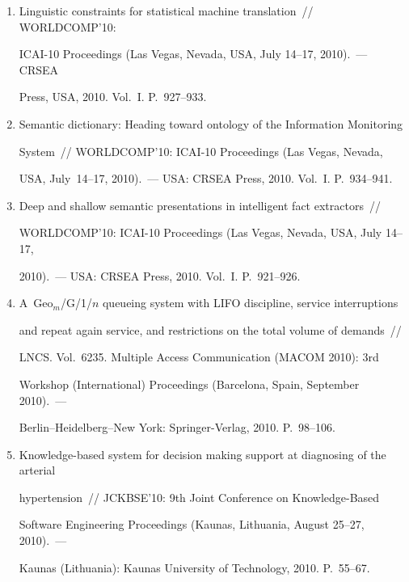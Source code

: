\begin{enumerate}[1.]
\item {}


Linguistic constraints for statistical machine translation~/\!\!/  WORLDCOMP'10: 


ICAI-10 Proceedings (Las Vegas, Nevada, USA, July 14--17, 2010).~--- CRSEA 


Press, USA, 2010. Vol.~I. P.~927--933.


\item {}


Semantic dictionary: Heading toward ontology of the Information Monitoring 


System~/\!\!/  WORLDCOMP'10: ICAI-10 Proceedings (Las Vegas, Nevada, 


USA, July~14--17, 2010).~--- USA: CRSEA Press, 2010. Vol.~I. P.~934--941.


\item{}


Deep and shallow semantic presentations in intelligent fact extractors~/\!\!/  


WORLDCOMP'10: ICAI-10 Proceedings (Las Vegas, Nevada, USA, July 14--17, 


2010).~--- USA: CRSEA Press, 2010. Vol.~I. P.~921--926.


\item{}


A~Geo$_m$/G/1/$n$ queueing system with LIFO discipline, service interruptions 


and repeat again service, and restrictions on the total volume of demands~/\!\!/  


LNCS. Vol.~6235. Multiple Access Communication (MACOM 2010):  3rd 


Workshop (International) Proceedings (Barcelona, Spain, September 2010).~--- 


Berlin--Heidelberg--New York: Springer-Verlag, 2010. P.~98--106.


\item{}


Knowledge-based system for decision making support at diagnosing of the arterial 


hypertension~/\!\!/  JCKBSE'10: 9th Joint Conference on Knowledge-Based 


Software Engineering Proceedings (Kaunas, Lithuania, August 25--27, 2010).~--- 


Kaunas (Lithuania): Kaunas University of Technology, 2010. P.~55--67.



\end{enumerate}
